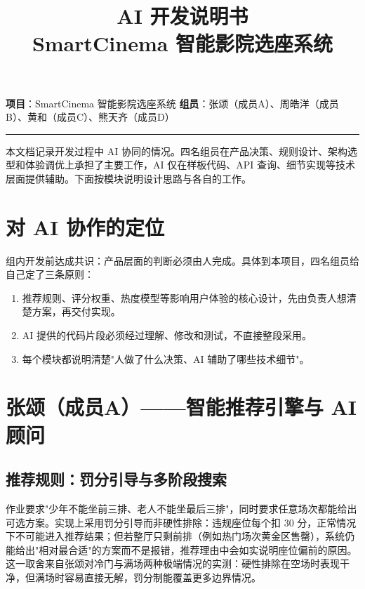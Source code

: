 \documentclass[12pt,a4paper]{ctexart}
\title{\vspace{-1.5cm}\textbf{AI 开发说明书}\\[0.3em]\large SmartCinema 智能影院选座系统}
\author{}
\date{}
\begin{document}
\maketitle
\vspace{-1.5cm}

\noindent\textbf{项目}：SmartCinema 智能影院选座系统\quad
\textbf{组员}：张颂（成员A）、周皓洋（成员B）、黄和（成员C）、熊天齐（成员D）

\vspace{0.4em}
\noindent\rule{\textwidth}{0.4pt}

\vspace{0.3em}
本文档记录开发过程中 AI 协同的情况。四名组员在产品决策、规则设计、架构选型和体验调优上承担了主要工作，AI 仅在样板代码、API 查询、细节实现等技术层面提供辅助。下面按模块说明设计思路与各自的工作。

\section{对 AI 协作的定位}

组内开发前达成共识：产品层面的判断必须由人完成。具体到本项目，四名组员给自己定了三条原则：

\begin{enumerate}
  \item 推荐规则、评分权重、热度模型等影响用户体验的核心设计，先由负责人想清楚方案，再交付实现。
  \item AI 提供的代码片段必须经过理解、修改和测试，不直接整段采用。
  \item 每个模块都说明清楚"人做了什么决策、AI 辅助了哪些技术细节"。
\end{enumerate}

\section{张颂（成员A）——智能推荐引擎与 AI 顾问}

\subsection{推荐规则：罚分引导与多阶段搜索}

作业要求"少年不能坐前三排、老人不能坐最后三排"，同时要求任意场次都能给出可选方案。实现上采用罚分引导而非硬性排除：违规座位每个扣 30 分，正常情况下不可能进入推荐结果；但若整厅只剩前排（例如热门场次黄金区售罄），系统仍能给出"相对最合适"的方案而不是报错，推荐理由中会如实说明座位偏前的原因。这一取舍来自张颂对冷门与满场两种极端情况的实测：硬性排除在空场时表现干净，但满场时容易直接无解，罚分制能覆盖更多边界情况。
\end{document}

